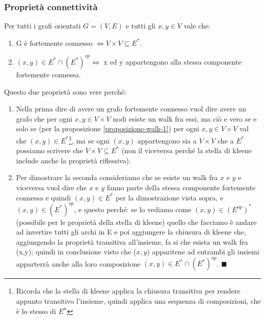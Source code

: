 \subsubsection{Proprietà connettività}
\begin{proposition}\label{proposizione-connettività-1}
    Per tutti i grafi orientati $G=(V,E)$ e tutti gli $x,y \in V$ vale che:
    \begin{enumerate}
        \item G è fortemente connesso $\Longleftrightarrow V \times V \subseteq E^*$.
        \item $(x,y) \in E^* \cap (E^*)^{op} \Longleftrightarrow$ x ed y appartengono alla stessa componente fortemente connessa.
    \end{enumerate}
\end{proposition}
\begin{demostration} \label{dimostrazione-prop-1}
Questo due proprietà sono vere perché:
\begin{enumerate}
    \item Nella prima dire di avere un grafo fortemente connesso vuol dire avere un grafo che per ogni $x, y \in V \times V$ nodi esiste un walk fra essi, ma ciò e vero se e solo se (per la proposizione \ref{proposizione-walk-1}) per ogni $x, y \in V \times V$ val che  $(x,y) \in E^*$\footnote{Ricorda che la stella di kleene applica la chiusura transitiva per rendere appunto transitivo l'insieme, quindi applica una sequenza di composizioni, che è lo stesso di $E^n$}, ma se ogni $(x,y)$ appartengono sia a $V \times V$ che a $E^*$ possiamo scrivere che $V \times V \subseteq E^*$ (non il viceversa perché la stella di kleene include anche la proprietà riflessiva).
    \item Per dimostrare la seconda consideriamo che se esiste un walk fra $x$ e $y$ e viceversa vuol dire che $x$ e $y$ fanno parte della stessa componente fortemente connessa e quindi $(x,y) \in E^*$ per la dimostrazione vista sopra, e $(x,y) \in (E^*)^{op}$, e questo perché: se lo vediamo come $(x,y) \in (E^{op})^*$ (possibile per le proprietà della stella di kleene) quello che facciamo è andare ad invertire tutti gli archi in E e poi aggiungere la chiusura di kleene che, aggiungendo la proprietà transitiva all'insieme, fa si che esista un walk fra (x,y); quindi in conclusione visto che ($x,y$) apparitene ad entrambi gli insiemi apparterrà anche alla loro composizione $(x,y) \in E^* \cap (E^*)^{op}$. $\blacksquare$
\end{enumerate}
\end{demostration}

